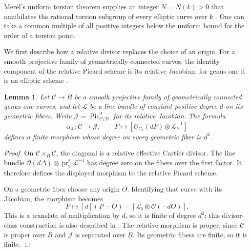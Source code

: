 \documentclass[11pt,a4paper]{article}
\newtheorem{lemma}[theorem]{Lemma}
\theoremstyle{definition}
\begin{document}
Merel's uniform torsion theorem supplies an integer $N=N(k)>0$
that annihilates the rational torsion subgroup of every elliptic
curve over $k$ \cite[Introductory Corollary]{Merel}. One can take
a common multiple of all positive integers below the uniform
bound for the order of a torsion point.

We first describe how a relative divisor replaces the choice of an
origin. For a smooth projective family of geometrically connected
curves, the identity component of the relative Picard scheme is its
relative Jacobian; for genus one it is an elliptic scheme
\cite[Section 9.4, Theorem 1]{BLR}.

\begin{lemma}\label{lem:divisor-map}
Let $\mathcal C\to B$ be a smooth projective family of geometrically
connected genus-one curves, and let $\mathcal L$ be a line bundle
of constant positive degree $d$ on its geometric fibers. Write
$\mathcal J=\operatorname{Pic}^0_{\mathcal C/B}$ for its relative
Jacobian. The formula
\[
 \alpha_{\mathcal L}:\mathcal C\longrightarrow\mathcal J,
 \qquad P\longmapsto
 [\mathcal O_{\mathcal C_b}(dP)\otimes\mathcal L_b^{-1}]
\]
defines a finite morphism whose degree on every geometric fiber is
$d^2$.
\end{lemma}
\begin{proof}
On $\mathcal C\times_B\mathcal C$, the diagonal is a relative
effective Cartier divisor. The line bundle
$\mathcal O(d\Delta)\otimes\operatorname{pr}_2^*\mathcal L^{-1}$
has degree zero on the fibers over the first factor. It therefore
defines the displayed morphism to the relative Picard scheme.

On a geometric fiber choose any origin $O$. Identifying that curve
with its Jacobian, the morphism becomes
\[
             P\longmapsto[d](P-O)
               -[\mathcal L_b\otimes\mathcal O(-dO)].
\]
This is a translate of multiplication by $d$, so it is finite
of degree $d^2$; this divisor-class construction is also described
in \cite[Section 1]{AKMMMP}. The relative morphism is proper,
since $\mathcal C$ is proper over $B$ and $\mathcal J$ is separated
over $B$. Its geometric fibers are finite, so it is finite.
\end{proof}
\end{document}
